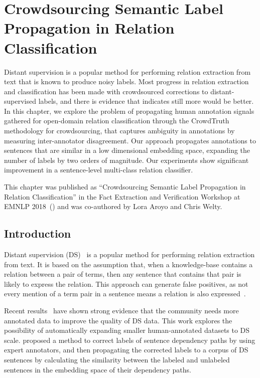\chapter{Crowdsourcing Semantic Label Propagation in Relation Classification}

Distant supervision is a popular method for performing relation extraction from text that is known to produce noisy labels.  Most progress in relation extraction and classification has been made with crowdsourced corrections to distant-supervised labels, and there is evidence that indicates still more would be better.  In this chapter, we explore the problem of propagating human annotation signals gathered for open-domain relation classification through the CrowdTruth methodology for crowdsourcing, that captures ambiguity in annotations by measuring inter-annotator disagreement. Our approach propagates annotations to sentences that are similar in a low dimensional embedding space, expanding the number of labels by two orders of magnitude.  Our experiments show significant improvement in a sentence-level multi-class relation classifier.

This chapter was published as ``Crowdsourcing Semantic Label Propagation in Relation Classification'' in the Fact Extraction and Verification Workshop at EMNLP 2018~(\citet{dumitrache2018crowdsourcing}) and was co-authored by Lora Aroyo and Chris Welty.

\section{Introduction}

Distant supervision (DS)~\cite{mintz2009distant} is a popular method for performing relation extraction from text. It is based on the assumption that, when a knowledge-base contains a relation between a pair of terms, then any sentence that contains that pair is likely to express the relation. This approach can generate false positives, as not every mention of a term pair in a sentence means a relation is also expressed~\cite{DBLP:conf/ijcai/FengGQLL17}. 

Recent results~\cite{angeli2014combining,liu2016effective} have shown strong evidence that the community needs more annotated data to improve the quality of DS data. This work explores the possibility of automatically expanding smaller human-annotated datasets to DS scale. \citet{sterckx2016knowledge} proposed a method to correct labels of sentence dependency paths by using expert annotators, and then propagating the corrected labels to a corpus of DS sentences by calculating the similarity between the labeled and unlabeled sentences in the embedding space of their dependency paths.

